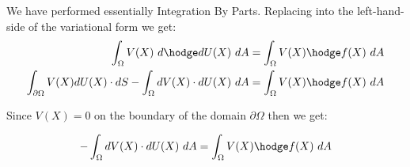 \documentclass{birkjour}
\numberwithin{equation}{section}
\begin{document}
We have performed essentially Integration By Parts. Replacing into the left-hand-side 
of the variational form we get:
\begin{eqnarray} 
\int_{\Omega} { V(X) \ d \hodge d U(X) \ dA } = \int_{\Omega} { V(X) \hodge f(X) \ dA } \nonumber\\
\int_{\partial \Omega} { V(X) dU(X) \cdot dS } - \int_{\Omega} {dV(X) \cdot dU(X) \ dA} = \int_{\Omega} { V(X) \hodge f(X) \ dA } \nonumber
\end{eqnarray}
 
Since $V(X) = 0$ on the boundary of the domain $\partial \Omega$ then we get:

\begin{eqnarray} 
	- \int_{\Omega} { dV(X) \cdot dU(X) \ dA } = \int_{\Omega} { V(X) \hodge f(X) \ dA } \nonumber
\end{eqnarray}





\end{document}
